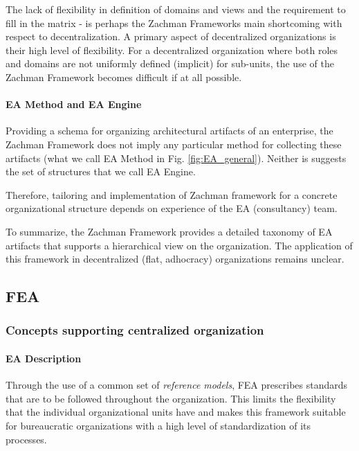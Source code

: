 The lack of flexibility in definition of domains and views and the requirement to fill in the matrix - is perhaps the Zachman Frameworks main shortcoming with respect to decentralization. A primary aspect of decentralized organizations is their high level of flexibility. For a decentralized organization where both roles and domains are not uniformly defined (implicit) for sub-units, the use of the Zachman Framework becomes difficult if at all possible.


\paragraph*{EA Method and EA Engine}

Providing a schema for organizing architectural artifacts of an enterprise, the Zachman Framework does not imply any particular method for collecting these artifacts (what we call EA Method in Fig. \ref{fig:EA_general}).
Neither is suggests the set of structures that we call EA Engine. 

Therefore, tailoring and  implementation of Zachman framework for a concrete organizational structure depends on experience of the EA (consultancy) team.

To summarize, the Zachman Framework provides a detailed taxonomy of EA artifacts that supports a hierarchical view on the organization. The application of this framework in decentralized (flat, adhocracy) organizations remains unclear.

\subsection{FEA}
\subsubsection{Concepts supporting centralized organization}
\paragraph*{EA Description}
Through the use of a common set of \textit{reference models}, FEA prescribes standards that are to be followed throughout the organization. This limits the flexibility that the individual organizational units have and makes this framework suitable for bureaucratic organizations with a high level of standardization of its processes.

